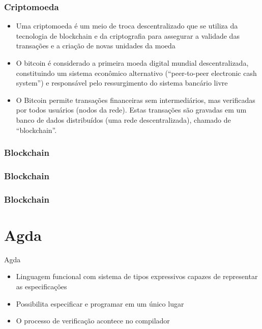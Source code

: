 \documentclass{beamer}
\begin{document}
\begin{frame}
  \frametitle{Criptomoeda}
\begin{itemize}
    \item Uma criptomoeda é um meio de troca descentralizado que se utiliza da tecnologia de blockchain e da criptografia para assegurar a validade das transações e a criação de novas unidades da moeda
    \item O bitcoin é considerado a primeira moeda digital mundial descentralizada, constituindo um sistema econômico alternativo (\foreignquote{english}{peer-to-peer electronic cash system}) e responsável pelo ressurgimento do sistema bancário livre
      \cite{nakamoto2008bitcoin}
    \item O Bitcoin permite transações financeiras sem intermediários, mas verificadas por todos usuários (nodos da rede). Estas transações são gravadas em um banco de dados distribuídos (uma rede descentralizada), chamado de \foreignquote{english}{blockchain}.
    \end{itemize}
\end{frame}

\begin{frame}
\frametitle{Blockchain}
\end{frame}

\begin{frame}
\frametitle{Blockchain}
\end{frame}

\begin{frame}
\frametitle{Blockchain}
\end{frame}
 
\section{Agda}

 \begin{frame}{Agda}
 \begin{itemize}
   \item Linguagem funcional com sistema de tipos expressivos capazes de representar as especificações
     \item Possibilita especificar e programar em um único lugar
     \item O processo de verificação acontece no compilador
 \end{itemize}
 \end{frame}
 
\end{document}
